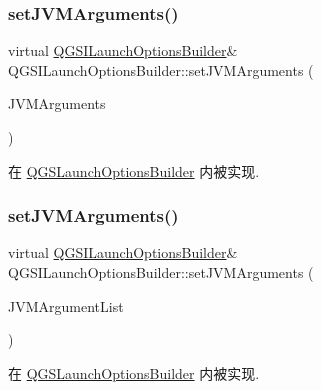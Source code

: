 \subsubsection{\texorpdfstring{set\+J\+V\+M\+Arguments()}{setJVMArguments()}\hspace{0.1cm}{\footnotesize\ttfamily [1/2]}}
{\footnotesize\ttfamily virtual \mbox{\hyperlink{class_q_g_s_i_launch_options_builder}{Q\+G\+S\+I\+Launch\+Options\+Builder}}\& Q\+G\+S\+I\+Launch\+Options\+Builder\+::set\+J\+V\+M\+Arguments (\begin{DoxyParamCaption}\item[{const Q\+String \&}]{J\+V\+M\+Arguments }\end{DoxyParamCaption})\hspace{0.3cm}{\ttfamily [pure virtual]}}



在 \mbox{\hyperlink{class_q_g_s_launch_options_builder_ad0f4f7bc30016b6ceb79d91330f8e6a1}{Q\+G\+S\+Launch\+Options\+Builder}} 内被实现.

\mbox{\label{class_q_g_s_i_launch_options_builder_af5a17db86753583d29a0776b05e67387}} 
\subsubsection{\texorpdfstring{set\+J\+V\+M\+Arguments()}{setJVMArguments()}\hspace{0.1cm}{\footnotesize\ttfamily [2/2]}}
{\footnotesize\ttfamily virtual \mbox{\hyperlink{class_q_g_s_i_launch_options_builder}{Q\+G\+S\+I\+Launch\+Options\+Builder}}\& Q\+G\+S\+I\+Launch\+Options\+Builder\+::set\+J\+V\+M\+Arguments (\begin{DoxyParamCaption}\item[{const Q\+String\+List \&}]{J\+V\+M\+Argument\+List }\end{DoxyParamCaption})\hspace{0.3cm}{\ttfamily [pure virtual]}}



在 \mbox{\hyperlink{class_q_g_s_launch_options_builder_a6db06aa915c13411c202e404acb5dd9f}{Q\+G\+S\+Launch\+Options\+Builder}} 内被实现.

\mbox{\label{class_q_g_s_i_launch_options_builder_ac5f8f2487f876513c06c2ebb134607aa}} 
